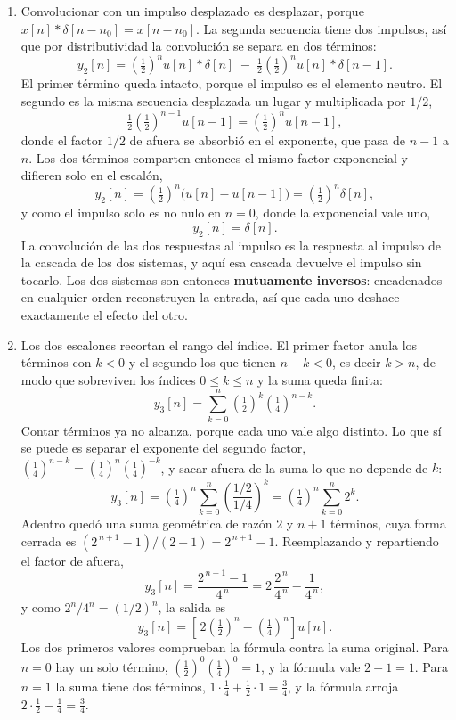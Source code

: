 \documentclass[10pt,a4paper]{article}
\begin{document}
\begin{enumerate}
		\item Convolucionar con un impulso
		desplazado es desplazar, porque $x[n]*\delta[n-n_0]=x[n-n_0]$. La segunda secuencia
		tiene dos impulsos, así que por distributividad la convolución se separa en dos
		términos:
		\[
			y_2[n] = \left(\tfrac{1}{2}\right)^{\!n} u[n] * \delta[n]
			       \;-\; \tfrac{1}{2}\left(\tfrac{1}{2}\right)^{\!n} u[n] * \delta[n-1].
		\]
		El primer término queda intacto, porque el impulso es el elemento neutro. El segundo
		es la misma secuencia desplazada un lugar y multiplicada por $1/2$,
		\[
			\tfrac{1}{2}\left(\tfrac{1}{2}\right)^{\!n-1} u[n-1]
			= \left(\tfrac{1}{2}\right)^{\!n} u[n-1],
		\]
		donde el factor $1/2$ de afuera se absorbió en el exponente, que pasa de $n-1$ a $n$.
		Los dos términos comparten entonces el mismo factor exponencial y difieren solo en el
		escalón,
		\[
			y_2[n] = \left(\tfrac{1}{2}\right)^{\!n}\bigl(u[n]-u[n-1]\bigr)
			       = \left(\tfrac{1}{2}\right)^{\!n} \delta[n],
		\]
		y como el impulso solo es no nulo en $n=0$, donde la exponencial vale uno,
		\[
			\boxed{\;y_2[n] = \delta[n].\;}
		\]
		La convolución de las dos respuestas al impulso es la respuesta al impulso de la
		cascada de los dos sistemas, y aquí esa cascada devuelve el impulso sin tocarlo. Los
		dos sistemas son entonces \textbf{mutuamente inversos}: encadenados en cualquier
		orden reconstruyen la entrada, así que cada uno deshace exactamente el efecto del otro.

		\item Los dos escalones recortan el rango del
		índice. El primer factor anula los términos con $k<0$ y el segundo los que tienen
		$n-k<0$, es decir $k>n$, de modo que sobreviven los índices $0 \le k \le n$ y la suma
		queda finita:
		\[
			y_3[n] = \sum_{k=0}^{n} \left(\tfrac{1}{2}\right)^{\!k}
			         \left(\tfrac{1}{4}\right)^{\!n-k}.
		\]
		Contar términos ya no alcanza, porque cada uno vale algo distinto. Lo que sí se puede
		es separar el exponente del segundo factor, $\left(\tfrac14\right)^{n-k}
		=\left(\tfrac14\right)^{n}\left(\tfrac14\right)^{-k}$, y sacar afuera de la suma lo
		que no depende de $k$:
		\[
			y_3[n] = \left(\tfrac{1}{4}\right)^{\!n} \sum_{k=0}^{n} \left(\frac{1/2}{1/4}\right)^{\!k}
			       = \left(\tfrac{1}{4}\right)^{\!n} \sum_{k=0}^{n} 2^{k}.
		\]
		Adentro quedó una suma geométrica de razón $2$ y $n+1$ términos, cuya forma cerrada
		es $(2^{\,n+1}-1)/(2-1) = 2^{\,n+1}-1$. Reemplazando y repartiendo el factor de
		afuera,
		\[
			y_3[n] = \frac{2^{\,n+1}-1}{4^{\,n}}
			       = 2\,\frac{2^{\,n}}{4^{\,n}} - \frac{1}{4^{\,n}},
		\]
		y como $2^n/4^n = (1/2)^n$, la salida es
		\[
			\boxed{\;y_3[n] = \left[\,2\left(\tfrac{1}{2}\right)^{\!n}
			         - \left(\tfrac{1}{4}\right)^{\!n}\right] u[n].\;}
		\]
		Los dos primeros valores comprueban la fórmula contra la suma original. Para $n=0$ hay
		un solo término, $\left(\tfrac12\right)^0\left(\tfrac14\right)^0=1$, y la fórmula
		vale $2-1=1$. Para $n=1$ la suma tiene dos términos,
		$1\cdot\tfrac14 + \tfrac12\cdot 1 = \tfrac34$, y la fórmula arroja
		$2\cdot\tfrac12-\tfrac14=\tfrac34$.


\end{enumerate}
\end{document}
